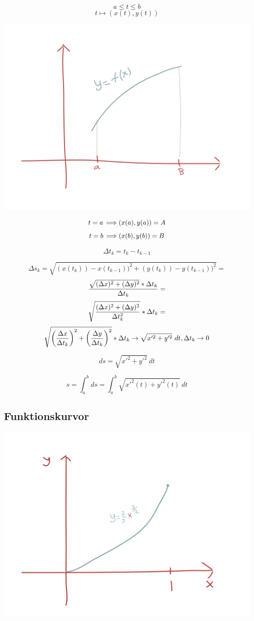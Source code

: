 \documentclass{article}
\begin{document}
$$ a\le t\le b $$
$$t \longmapsto (x(t), y(t)) $$

\includegraphics[scale=0.15]{img/img11.jpg}

$$ t=a\operatorname{\implies}(x(a), y(a)) = A $$
$$ t=b\operatorname{\implies}(x(b), y(b)) = B $$

$$ \Delta t_k = t_k - t_{k-1} $$

$$ \Delta s_k = \sqrt{(x(t_k)) - x(t_{k-1}))^2 + (y(t_k)) - y(t_{k-1}))^2 } =$$
$$\frac{\sqrt{(\Delta x)^2 + (\Delta y)^2} * \Delta t_k}{\Delta t_k} =  $$
$$\sqrt{\frac{(\Delta x)^2 + (\Delta y)^2}{\Delta t_k^2}}*\Delta t_k =  $$
$$\sqrt{\left(\frac{\Delta x}{\Delta t_k}\right)^2+\left(\frac{\Delta y}{\Delta t_k}\right)^2 } * \Delta t_k
\to \sqrt{x'^2 + y'^2}\ dt, \Delta t_k \to 0$$

$$ ds = \sqrt{x'^2 + y'^2}\ dt $$

$$ s = \int^b_a ds = \int^b_a{\sqrt{x'^2(t) + y'^2(t)}\ dt} $$

\subsection{Funktionskurvor}

\includegraphics[scale=0.15]{img/img12.jpg}
\end{document}
